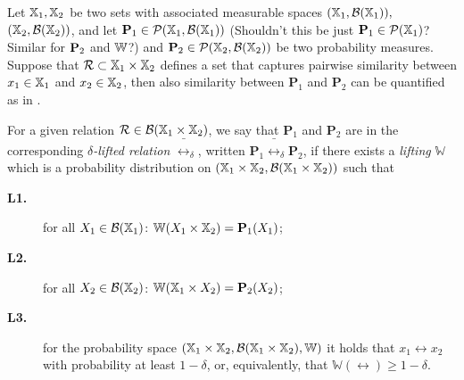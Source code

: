 \documentclass{ifacconf}
\newcommand{\cristi}[1]{{\color{olive}#1}}
\begin{document}
Let ${\mathbb{X}}_1,{\mathbb{X}}_2$ be two sets with associated measurable spaces $({\mathbb{X}}_1,\mathcal B({\mathbb{X}}_1)),$ $({\mathbb{X}}_2,\mathcal B({\mathbb{X}}_2))$, and let $\mathbf{P}_1 \in \mathcal{P}({\mathbb{X}}_1,\mathcal B({\mathbb{X}}_1)) $ \cristi{(Shouldn't this be just $\mathbf{P}_1 \in \mathcal{P}({\mathbb{X}}_1)$? Similar for $\mathbf{P}_2$ and $\mathbb{W}$?)} and $\mathbf{P}_2 \in \mathcal{P}({\mathbb{X}}_2,\mathcal B({\mathbb{X}}_2)) $ be two probability measures. Suppose that $\mathcal{R} \subset {\mathbb{X}}_1 \times {\mathbb{X}}_2$ defines a set that captures pairwise similarity between $x_1 \in {\mathbb{X}}_1$ and $x_2 \in {\mathbb{X}}_2$, then also similarity between $\mathbf{P}_1$ and $\mathbf{P}_2$ can be quantified as in \cite{haesaert2017verification}.
%
\begin{definition}
\label{def:dellifting}
  For a given relation $\mathcal{R}\in \mathcal B({\mathbb{X}}_1\times {\mathbb{X}}_2)$, we say that  $\mathbf{P}_1$ and $\mathbf{P}_2$ are in the corresponding \emph{$\delta$-lifted relation} $\bar \rel_\delta$, written $\mathbf{P}_1 \bar \rel_\delta \mathbf{P}_2$, if there exists a \emph{lifting} $\mathbb{W}$ which is a probability distribution on $({\mathbb{X}}_1\times {\mathbb{X}}_2,\mathcal B({\mathbb{X}}_1\times {\mathbb{X}}_2))$ such that { \setlength{\parskip}{-1pt}\setlength{\parsep}{0pt}
		\begin{description}
			\item[\textbf{L1.}] for all $X_1\in \mathcal{B}({\mathbb{X}}_1)$: $\mathbb W(X_1\times {\mathbb{X}}_2)=\mathbf{P}_1(X_1)$;
			\item [\textbf{L2.}] for all $X_2\in \mathcal{B}({\mathbb{X}}_2)$:  $\mathbb W({\mathbb{X}}_1\times X_2)=\mathbf{P}_2(X_2)$;
			\item[\textbf{L3.}] for the probability space  $({\mathbb{X}}_1\times {\mathbb{X}}_2,\mathcal B({\mathbb{X}}_1\times {\mathbb{X}}_2), \mathbb W)$ it holds that
			$x_1\rel x_2$ with probability at least $1-\delta$, or, equivalently, that $\mathbb{W}\left(\rel\right)\geq1-\delta$.
	\end{description}}
\end{definition}
\end{document}

